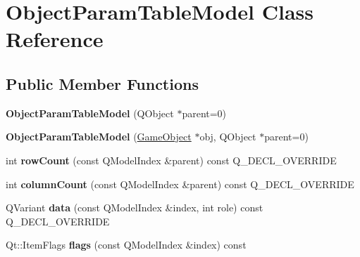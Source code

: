 \hypertarget{class_object_param_table_model}{\section{\-Object\-Param\-Table\-Model \-Class \-Reference}
\label{class_object_param_table_model}
}
\subsection*{\-Public \-Member \-Functions}
\begin{DoxyCompactItemize}
\item 
\hypertarget{class_object_param_table_model_a8300c6fd1c84e9cf7a63fdd3819ad50d}{{\bfseries \-Object\-Param\-Table\-Model} (\-Q\-Object $\ast$parent=0)}\label{class_object_param_table_model_a8300c6fd1c84e9cf7a63fdd3819ad50d}

\item 
\hypertarget{class_object_param_table_model_a78d12e6b7666517b243f1acaf55a407f}{{\bfseries \-Object\-Param\-Table\-Model} (\hyperlink{class_game_object}{\-Game\-Object} $\ast$obj, \-Q\-Object $\ast$parent=0)}\label{class_object_param_table_model_a78d12e6b7666517b243f1acaf55a407f}

\item 
\hypertarget{class_object_param_table_model_a4be03e27217195b58f40a26ed200d103}{int {\bfseries row\-Count} (const \-Q\-Model\-Index \&parent) const \-Q\-\_\-\-D\-E\-C\-L\-\_\-\-O\-V\-E\-R\-R\-I\-D\-E}\label{class_object_param_table_model_a4be03e27217195b58f40a26ed200d103}

\item 
\hypertarget{class_object_param_table_model_af6c04299990e8c2b84247523b743d39e}{int {\bfseries column\-Count} (const \-Q\-Model\-Index \&parent) const \-Q\-\_\-\-D\-E\-C\-L\-\_\-\-O\-V\-E\-R\-R\-I\-D\-E}\label{class_object_param_table_model_af6c04299990e8c2b84247523b743d39e}

\item 
\hypertarget{class_object_param_table_model_a3da7a622e55f575af0b61dbf9d4e601a}{\-Q\-Variant {\bfseries data} (const \-Q\-Model\-Index \&index, int role) const \-Q\-\_\-\-D\-E\-C\-L\-\_\-\-O\-V\-E\-R\-R\-I\-D\-E}\label{class_object_param_table_model_a3da7a622e55f575af0b61dbf9d4e601a}

\item 
\hypertarget{class_object_param_table_model_ae1614bad47a855d54290311e5c800f27}{\-Qt\-::\-Item\-Flags {\bfseries flags} (const \-Q\-Model\-Index \&index) const }\label{class_object_param_table_model_ae1614bad47a855d54290311e5c800f27}


\end{DoxyCompactItemize}

